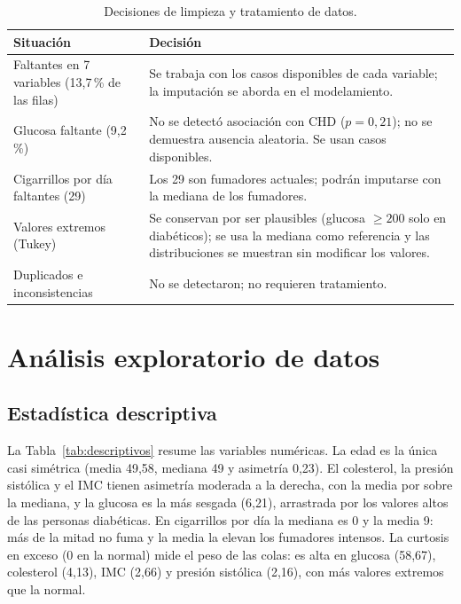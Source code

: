 \documentclass[11pt,a4paper]{article}
\begin{document}
\begin{table}[H]
\centering
\small
\caption{Decisiones de limpieza y tratamiento de datos.}
\label{tab:limpieza}
\begin{tabular}{>{\raggedright\arraybackslash}p{4.6cm} >{\raggedright\arraybackslash}p{10.2cm}}
\toprule
\textbf{Situación} & \textbf{Decisión} \\
\midrule
Faltantes en 7 variables (13{,}7\,\% de las filas) & Se trabaja con los casos disponibles de cada variable; la imputación se aborda en el modelamiento. \\
Glucosa faltante (9{,}2\,\%) & No se detectó asociación con CHD ($p=0{,}21$); no se demuestra ausencia aleatoria. Se usan casos disponibles. \\
Cigarrillos por día faltantes (29) & Los 29 son fumadores actuales; podrán imputarse con la mediana de los fumadores. \\
Valores extremos (Tukey) & Se conservan por ser plausibles (glucosa $\geq200$ solo en diabéticos); se usa la mediana como referencia y las distribuciones se muestran sin modificar los valores. \\
Duplicados e inconsistencias & No se detectaron; no requieren tratamiento. \\
\bottomrule
\end{tabular}
\end{table}

\section{Análisis exploratorio de datos}

\subsection{Estadística descriptiva}
La Tabla~\ref{tab:descriptivos} resume las variables numéricas. La edad es la única casi simétrica
(media 49{,}58, mediana 49 y asimetría 0{,}23). El colesterol, la presión sistólica y el IMC tienen asimetría
moderada a la derecha, con la media por sobre la mediana, y la glucosa es la más sesgada (6{,}21), arrastrada
por los valores altos de las personas diabéticas. En cigarrillos por día la mediana es 0 y la media 9: más
de la mitad no fuma y la media la elevan los fumadores intensos.
La curtosis en exceso (0 en la normal) mide el peso de las colas: es alta en glucosa (58{,}67), colesterol (4{,}13), IMC (2{,}66) y presión sistólica (2{,}16), con más valores extremos que la normal.
\end{document}

